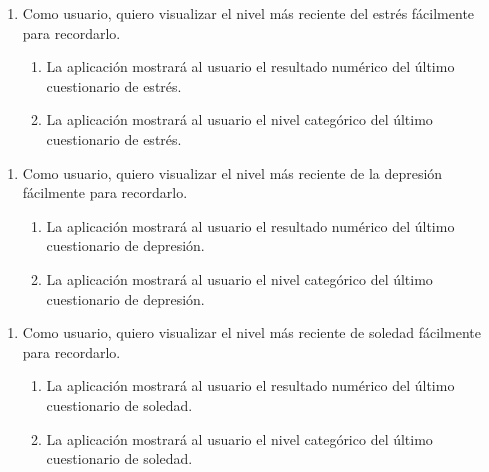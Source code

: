         \begin{enumerate}[resume=req-usuario,label=\textbf{\texttt{RU-\arabic*}}]
            \item \label{req:usuario:visualizar_estres} Como usuario, quiero visualizar el nivel más reciente del estrés fácilmente para recordarlo.
            \begin{enumerate}[resume=req-funcionales,label=\textbf{\texttt{RF-\arabic*}}]
                \item \label{req:funcionales:visualizar_estres_numero} La aplicación mostrará al usuario el resultado numérico del último cuestionario de estrés.
                \item \label{req:funcionales:visualizar_estres_categoria} La aplicación mostrará al usuario el nivel categórico del último cuestionario de estrés.
            \end{enumerate}
        \end{enumerate}
        \begin{enumerate}[resume=req-usuario,label=\textbf{\texttt{RU-\arabic*}}]
            \item \label{req:usuario:visualizar_depresion} Como usuario, quiero visualizar el nivel más reciente de la depresión fácilmente para recordarlo.
            \begin{enumerate}[resume=req-funcionales,label=\textbf{\texttt{RF-\arabic*}}]
                \item \label{req:funcionales:visualizar_depresion_numero} La aplicación mostrará al usuario el resultado numérico del último cuestionario de depresión.
                \item \label{req:funcionales:visualizar_depresion_categoria} La aplicación mostrará al usuario el nivel categórico del último cuestionario de depresión.
            \end{enumerate}
        \end{enumerate}
        \begin{enumerate}[resume=req-usuario,label=\textbf{\texttt{RU-\arabic*}}]
            \item \label{req:usuario:visualizar_soledad} Como usuario, quiero visualizar el nivel más reciente de soledad fácilmente para recordarlo.
            \begin{enumerate}[resume=req-funcionales,label=\textbf{\texttt{RF-\arabic*}}]
                \item \label{req:funcionales:visualizar_soledad_numero} La aplicación mostrará al usuario el resultado numérico del último cuestionario de soledad.
                \item \label{req:funcionales:visualizar_soledad_categoria} La aplicación mostrará al usuario el nivel categórico del último cuestionario de soledad.
            \end{enumerate}
        \end{enumerate}
